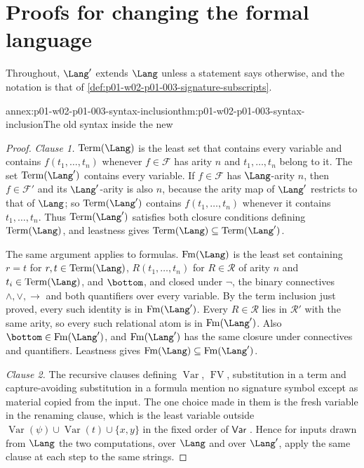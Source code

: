 \section{Proofs for changing the formal language}
\label{sec:annex-p01-w02-p01-003-language-change}

Throughout, \(\Lang'\) extends \(\Lang\) unless a statement says otherwise,
and the notation is that of
\cref{def:p01-w02-p01-003-signature-subscripts}.

\begin{annexitem}{annex:p01-w02-p01-003-syntax-inclusion}{thm:p01-w02-p01-003-syntax-inclusion}{The old syntax inside the new}
\begin{proof}
\emph{Clause 1.} \(\operatorname{Term}(\Lang)\) is the least set that
contains every variable and contains \(f(t_1,\ldots,t_n)\) whenever
\(f\in\mathcal F\) has arity \(n\) and \(t_1,\ldots,t_n\) belong to it. The
set \(\operatorname{Term}(\Lang')\) contains every variable. If
\(f\in\mathcal F\) has \(\Lang\)-arity \(n\), then \(f\in\mathcal F'\) and its
\(\Lang'\)-arity is also \(n\), because the arity map of \(\Lang'\) restricts
to that of \(\Lang\); so \(\operatorname{Term}(\Lang')\) contains
\(f(t_1,\ldots,t_n)\) whenever it contains \(t_1,\ldots,t_n\). Thus
\(\operatorname{Term}(\Lang')\) satisfies both closure conditions defining
\(\operatorname{Term}(\Lang)\), and leastness gives
\(\operatorname{Term}(\Lang)\subseteq\operatorname{Term}(\Lang')\).

The same argument applies to formulas. \(\operatorname{Fm}(\Lang)\) is the
least set containing \(r=t\) for \(r,t\in\operatorname{Term}(\Lang)\),
\(R(t_1,\ldots,t_n)\) for \(R\in\mathcal R\) of arity \(n\) and
\(t_i\in\operatorname{Term}(\Lang)\), and \(\bottom\), and closed under
\(\neg\), the binary connectives \(\land,\lor,\to\) and both quantifiers
over every variable. By the term inclusion just proved, every such identity
is in \(\operatorname{Fm}(\Lang')\). Every \(R\in\mathcal R\) lies in
\(\mathcal R'\) with the same arity, so every such relational atom is in
\(\operatorname{Fm}(\Lang')\). Also \(\bottom\in\operatorname{Fm}(\Lang')\),
and \(\operatorname{Fm}(\Lang')\) has the same closure under connectives and
quantifiers. Leastness gives
\(\operatorname{Fm}(\Lang)\subseteq\operatorname{Fm}(\Lang')\).

\emph{Clause 2.} The recursive clauses defining \(\operatorname{Var}\),
\(\operatorname{FV}\), substitution in a term and capture-avoiding
substitution in a formula mention no signature symbol except as material
copied from the input. The one choice made in them is the fresh variable in
the renaming clause, which is the least variable outside
\(\operatorname{Var}(\psi)\cup\operatorname{Var}(t)\cup\{x,y\}\) in the fixed
order of \(\mathsf{Var}\) \cite[ch.~``First-Order Syntax'', section
``Capture-avoiding substitution'']{FrozenFormalLogicLanguageChange}. Hence for
inputs drawn from \(\Lang\) the two computations, over \(\Lang\) and over
\(\Lang'\), apply the same clause at each step to the same strings.


\end{proof}
\end{annexitem}
